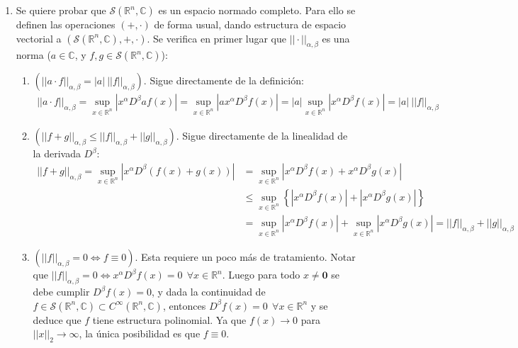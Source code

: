 \documentclass[spanish, fleqn]{article}
\begin{document}
\begin{description}
\begin{enumerate}
        \item Se quiere probar que $\mathcal{S}(\mathbb{R}^n,\mathbb{C})$ es un espacio normado completo. Para ello se definen las operaciones $(+,\cdot)$ de forma usual, dando estructura de espacio vectorial a $\displaystyle \left(\mathcal{S}(\mathbb{R}^n,\mathbb{C}),+,\cdot \right)$. Se verifica en primer lugar que $||\cdot||_{\alpha,\beta}$ es una norma ($a \in \mathbb{C}$, y $f,g \in \mathcal{S}(\mathbb{R}^n,\mathbb{C})$):
        \begin{enumerate}
            \item $\left( ||a \cdot f||_{\alpha,\beta} = |a| \ ||f||_{\alpha,\beta} \right)$. Sigue directamente de la definición:
            \begin{align*}
                ||a \cdot f||_{\alpha,\beta} = \sup_{x \in \mathbb{R}^n} \left| x^{\alpha} D^{\beta} a f(x) \right| = \sup_{x \in \mathbb{R}^n} \left| a x^{\alpha} D^{\beta} f(x) \right| = |a| \sup_{x \in \mathbb{R}^n} \left| x^{\alpha} D^{\beta} f(x) \right| = |a| \ ||f||_{\alpha,\beta}
            \end{align*}
            \item $\left( ||f+g||_{\alpha,\beta} \leq ||f||_{\alpha,\beta} + ||g||_{\alpha,\beta }\right)$. Sigue directamente de la linealidad de la derivada $D^{\beta}$:
            \begin{align*}
                 ||f+g||_{\alpha,\beta} =  \sup_{x \in \mathbb{R}^n} \left| x^{\alpha} D^{\beta}\left( f(x)+g(x) \right) \right| &= \sup_{x \in \mathbb{R}^n} \left| x^{\alpha} D^{\beta} f(x) +  x^{\alpha} D^{\beta} g(x) \right| \\ &\leq \sup_{x \in \mathbb{R}^n} \left\{ \left| x^{\alpha} D^{\beta} f(x) \right| +  \left|  x^{\alpha} D^{\beta} g(x) \right| \right\}\\ &= \sup_{x \in \mathbb{R}^n}  \left| x^{\alpha} D^{\beta} f(x) \right| + \sup_{x \in \mathbb{R}^n}  \left|  x^{\alpha} D^{\beta} g(x) \right| = ||f||_{\alpha,\beta} + ||g||_{\alpha,\beta }
            \end{align*}
            \item $\left( ||f||_{\alpha,\beta}=0 \Leftrightarrow f \equiv 0 \right)$. Esta requiere un poco más de tratamiento. Notar que $||f||_{\alpha,\beta}=0 \Leftrightarrow x^{\alpha}D^{\beta} f(x) = 0 \ \ \forall x \in \mathbb{R}^n$. Luego para todo $x \neq \mathbf{0}$ se debe cumplir $D^{\beta} f(x)=0$, y dada la continuidad de $f \in \mathcal{S}(\mathbb{R}^n,\mathbb{C}) \subset C^{\infty}(\mathbb{R}^n,\mathbb{C})$, entonces $D^{\beta} f(x)=0 \ \ \forall x \in \mathbb{R}^n$ y se deduce que $f$ tiene estructura polinomial. Ya que $f(x)\rightarrow 0$ para $||x||_2 \rightarrow \infty$, la única posibilidad es que $f \equiv 0$.
        \end{enumerate}


\end{enumerate}
\end{description}
\end{document}
